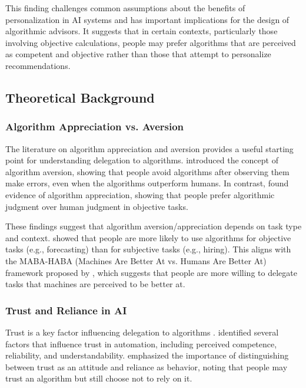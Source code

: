 This finding challenges common assumptions about the benefits of personalization in AI systems and has important implications for the design of algorithmic advisors. It suggests that in certain contexts, particularly those involving objective calculations, people may prefer algorithms that are perceived as competent and objective rather than those that attempt to personalize recommendations.

\subsection{Theoretical Background}

\subsubsection{Algorithm Appreciation vs. Aversion}

The literature on algorithm appreciation and aversion provides a useful starting point for understanding delegation to algorithms. \citet{dietvorst2015} introduced the concept of algorithm aversion, showing that people avoid algorithms after observing them make errors, even when the algorithms outperform humans. In contrast, \citet{logg2019} found evidence of algorithm appreciation, showing that people prefer algorithmic judgment over human judgment in objective tasks.

These findings suggest that algorithm aversion/appreciation depends on task type and context. \citet{castelo2019} showed that people are more likely to use algorithms for objective tasks (e.g., forecasting) than for subjective tasks (e.g., hiring). This aligns with the MABA-HABA (Machines Are Better At vs. Humans Are Better At) framework proposed by \citet{glikson2020}, which suggests that people are more willing to delegate tasks that machines are perceived to be better at.

\subsubsection{Trust and Reliance in AI}

Trust is a key factor influencing delegation to algorithms \citep{lee2004, kohn2021}. \citet{hoff2015} identified several factors that influence trust in automation, including perceived competence, reliability, and understandability. \citet{kohn2021} emphasized the importance of distinguishing between trust as an attitude and reliance as behavior, noting that people may trust an algorithm but still choose not to rely on it.

